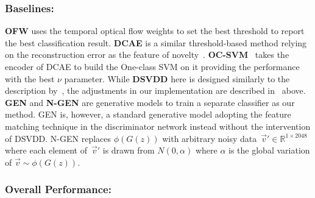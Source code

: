 \documentclass[letterpaper]{article} %
\begin{document}

\subsubsection{Baselines:}
\label{sec:baselines}

\textbf{OFW} uses the temporal optical flow weights to set the best
threshold to report the best classification result. \textbf{DCAE} is a
similar threshold-based method relying on the reconstruction error as
the feature of novelty~\citep{KWWBKA19}. \textbf{OC-SVM}~\citep{SPSSW01}
takes the encoder of DCAE to build the One-class SVM on it providing the
performance with the best $\nu$ parameter. While \textbf{DSVDD} here is
designed similarly to the description by~\citet{RVGDSBMK18}, the
adjustments in our implementation are described
in~ above. \textbf{GEN} and
\textbf{\mbox{N-GEN}}
are generative models to train a separate classifier as our method. GEN
is, however, a standard generative model adopting the feature matching
technique in the discriminator network instead without the intervention
of DSVDD. \mbox{N-GEN} replaces $\phi(G(z))$ with arbitrary noisy
data~$\vec{v}'\in\mathbb{R}^{1\times2048}$ where each element
of~$\vec{v}'$ is drawn from $\mathit{N}(0, \alpha)$ where $\alpha$ is
the global variation of $\vec{v}\sim\phi(G(z))$.

\subsubsection{Overall Performance:}
\label{sec:overall_performance}
\end{document}
